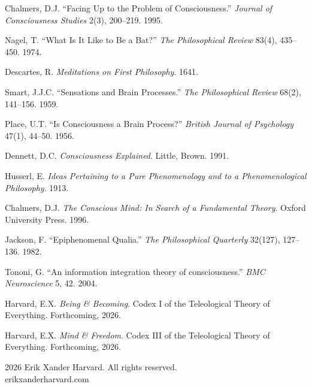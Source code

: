 \documentclass[12pt, letterpaper]{article}
\begin{document}
\begin{enumerate}[label={[\arabic*]}, nosep, leftmargin=2em]

\item Chalmers, D.J. ``Facing Up to the Problem of Consciousness.'' \textit{Journal of Consciousness Studies} 2(3), 200--219. 1995.

\item Nagel, T. ``What Is It Like to Be a Bat?'' \textit{The Philosophical Review} 83(4), 435--450. 1974.

\item Descartes, R. \textit{Meditations on First Philosophy}. 1641.

\item Smart, J.J.C. ``Sensations and Brain Processes.'' \textit{The Philosophical Review} 68(2), 141--156. 1959.

\item Place, U.T. ``Is Consciousness a Brain Process?'' \textit{British Journal of Psychology} 47(1), 44--50. 1956.

\item Dennett, D.C. \textit{Consciousness Explained}. Little, Brown. 1991.

\item Husserl, E. \textit{Ideas Pertaining to a Pure Phenomenology and to a Phenomenological Philosophy}. 1913.

\item Chalmers, D.J. \textit{The Conscious Mind: In Search of a Fundamental Theory}. Oxford University Press. 1996.

\item Jackson, F. ``Epiphenomenal Qualia.'' \textit{The Philosophical Quarterly} 32(127), 127--136. 1982.

\item Tononi, G. ``An information integration theory of consciousness.'' \textit{BMC Neuroscience} 5, 42. 2004.

\item Harvard, E.X. \textit{Being \& Becoming}. Codex I of the Teleological Theory of Everything. Forthcoming, 2026.

\item Harvard, E.X. \textit{Mind \& Freedom}. Codex III of the Teleological Theory of Everything. Forthcoming, 2026.

\end{enumerate}

\vspace{2em}
\begin{center}
{\small \textcopyright{} 2026 Erik Xander Harvard. All rights reserved.\\
erikxanderharvard.com}
\end{center}
\end{document}
